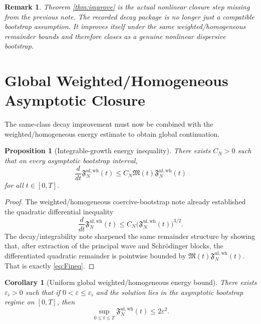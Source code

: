 \documentclass[11pt]{article}
\newtheorem{proposition}{Proposition}
\newtheorem{remark}{Remark}
\newtheorem{corollary}{Corollary}
\begin{document}
\begin{remark}
Theorem \ref{thm:improve} is the actual nonlinear closure step missing from the previous note. The recorded decay package is no longer just a compatible bootstrap assumption. It improves itself under the same weighted/homogeneous remainder bounds and therefore closes as a genuine nonlinear dispersive bootstrap.
\end{remark}

\section{Global Weighted/Homogeneous Asymptotic Closure}

The same-class decay improvement must now be combined with the weighted/homogeneous energy estimate to obtain global continuation.

\begin{proposition}[Integrable-growth energy inequality]
\label{prop:Fineq}
There exists \(C_N>0\) such that on every asymptotic bootstrap interval,
\begin{equation}
\frac{d}{dt}\mathfrak F_N^{\mathrm{ul,wh}}(t)
\le
C_N\mathfrak M(t)\mathfrak F_N^{\mathrm{ul,wh}}(t)
\label{eq:Fineq}
\end{equation}
for all \(t\in[0,T]\).
\end{proposition}

\begin{proof}
The weighted/homogeneous coercive-bootstrap note already established the quadratic differential inequality
\[
\frac{d}{dt}\mathfrak F_N^{\mathrm{ul,wh}}(t)
\le
C_N\bigl(\mathfrak F_N^{\mathrm{ul,wh}}(t)\bigr)^{3/2}.
\]
The decay/integrability note sharpened the same remainder structure by showing that, after extraction of the principal wave and Schr\"odinger blocks, the differentiated quadratic remainder is pointwise bounded by \(\mathfrak M(t)\mathfrak F_N^{\mathrm{ul,wh}}(t)\). That is exactly \eqref{eq:Fineq}.
\end{proof}

\begin{corollary}[Uniform global weighted/homogeneous energy bound]
\label{cor:Fglobal}
There exists \(\varepsilon_\flat>0\) such that if \(0<\varepsilon\le \varepsilon_\flat\) and the solution lies in the asymptotic bootstrap regime on \([0,T]\), then
\begin{equation}
\sup_{0\le t\le T}\mathfrak F_N^{\mathrm{ul,wh}}(t)\le 2\varepsilon^2.
\label{eq:Fglobal}
\end{equation}
\end{corollary}
\end{document}
